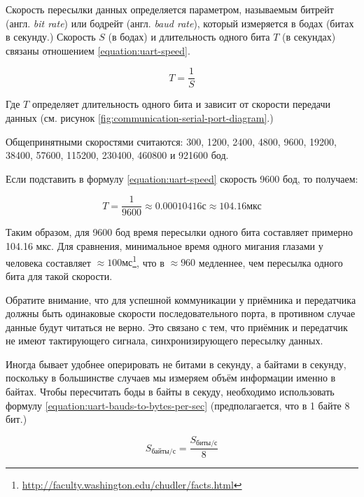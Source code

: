\documentclass[../sparc.tex]{subfiles}
\begin{document}
Скорость пересылки данных определяется параметром, называемым битрейт
(англ. \emph{bit rate}) или бодрейт (англ. \emph{baud rate}), который измеряется
в бодах (битах в секунду.)  Скорость $S$ (в бодах) и длительность одного бита
$T$ (в секундах) связаны отношением \ref{equation:uart-speed}.

\begin{equation}
  T = \frac{1}{S}
  \label{equation:uart-speed}
\end{equation}

Где $T$ определяет длительность одного бита и зависит от скорости передачи
данных (см. рисунок \ref{fig:communication-serial-port-diagram}.)

Общепринятными скоростями считаются: 300, 1200, 2400, 4800, 9600, 19200, 38400,
57600, 115200, 230400, 460800 и 921600 бод.

Если подставить в формулу \ref{equation:uart-speed} скорость 9600 бод, то получаем:

\begin{equation}
  T = \frac{1}{9600} \approx 0.00010416 \mbox{с} \approx 104.16 \mbox{мкс}
\end{equation}

Таким образом, для 9600 бод время пересылки одного бита составляет примерно
104.16 мкс.  Для сравнения, минимальное время одного мигания глазами у человека
составляет $\approx100
\mbox{мс}$\footnote{\url{http://faculty.washington.edu/chudler/facts.html}}, что
в $\approx960$ медленнее, чем пересылка одного бита для такой скорости.

Обратите внимание, что для успешной коммуникации у приёмника и передатчика
должны быть одинаковые скорости последовательного порта, в противном случае
данные будут читаться не верно.  Это связано с тем, что приёмник и передатчик не
имеют тактирующего сигнала, синхронизирующего пересылку данных.

Иногда бывает удобнее оперировать не битами в секунду, а байтами в секунду,
поскольку в большинстве случаев мы измеряем объём информации именно в байтах.
Чтобы пересчитать боды в байты в секуду, необходимо использовать формулу
\ref{equation:uart-bauds-to-bytes-per-sec} (предполагается, что в 1 байте 8
бит.)

\begin{equation}
  S_{\mbox{байты/с}} = \frac{S_{\mbox{биты/с}}}{8}
  \label{equation:uart-bauds-to-bytes-per-sec}
\end{equation}
\end{document}
